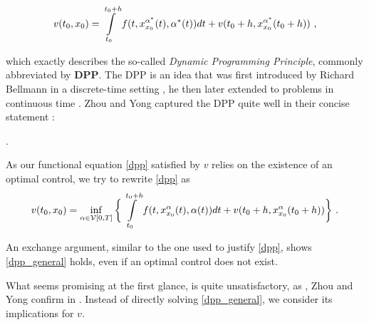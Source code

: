 	\begin{equation}
		\label{dpp}
		v(t_0, x_0) = \pathint{\alpha^{*}}{t_0}{t_0 + h} + v(t_0 + h, x^{\alpha^{*}}_{x_0}(t_0 + h)) \ ,
	\end{equation}
	
	which exactly describes the so-called \emph{Dynamic Programming Principle}, commonly abbreviated by \textbf{DPP}. The DPP is an idea that was first introduced by Richard Bellmann in a discrete-time setting \cite{bellmandiscrete}, he then later extended to problems in continuous time \cite{bellmancontinuous}. Zhou and Yong captured the DPP quite well in their concise statement \cite[p. ~160]{zhou}: 
	
	\begin{center}
		 .
	\end{center}

	As our functional equation \eqref{dpp} satisfied by $ v $ relies on the existence of an optimal control, we try to rewrite \eqref{dpp} as
	\begin{equation}
	\label{dpp_general}
	v(t_0, x_0) = \inf\limits_{\alpha \in \controlspace} \bigg\{ \pathint{\alpha}{t_0}{t_0 + h} + v(t_0 + h, x^{\alpha}_{x_0}(t_0 + h)) \bigg\} \ .
	\end{equation}
	
	An exchange argument, similar to the one used to justify \eqref{dpp}, shows \eqref{dpp_general} holds, even if an optimal control does not exist.
	
	What seems promising at the first glance, is quite unsatisfactory, as , Zhou and Yong confirm in \cite[p. ~160]{zhou}.
	Instead of directly solving \eqref{dpp_general}, we consider its implications for $ v $.